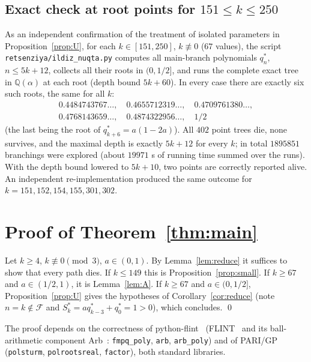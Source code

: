 \documentclass[11pt]{amsart}
\theoremstyle{definition}
\theoremstyle{remark}
\newcommand{\F}{\mathcal{F}}
\begin{document}
\subsection*{Exact check at root points for \texorpdfstring{$151\le k\le 250$}{151 <= k <= 250}}
As an independent confirmation of the treatment of isolated parameters in
Proposition~\ref{prop:U}, for each $k\in[151,250]$, $k\not\equiv 0$ ($67$ values), the
script \texttt{retsenziya/ildiz\_nuqta.py} computes all main-branch polynomials
$q^*_n$, $n\le 5k+12$, collects all their roots in $(0,1/2]$, and runs the complete
exact tree in $\mathbb{Q}(\alpha)$ at each root (depth bound $5k+60$). In every case
there are exactly six such roots, the same for all $k$:
\[
\begin{gathered}
0.4484743767\ldots,\quad 0.4655712319\ldots,\quad 0.4709761380\ldots,\\
0.4768143659\ldots,\quad 0.4874322956\ldots,\quad 1/2
\end{gathered}
\]
(the last being the root of $q^*_{k+6}=a(1-2a)$). All $402$ point trees die, none
survives, and the maximal depth is exactly $5k+12$ for every $k$; in total
$1895851$ branchings were explored (about $19971$ s of running time summed over the
runs). With the depth bound lowered to $5k+10$, two points are correctly reported
alive. An independent re-implementation produced the same outcome for
$k=151,152,154,155,301,302$.

\section{Proof of Theorem~\ref{thm:main}}

Let $k\ge 4$, $k\not\equiv 0\pmod 3$, $a\in(0,1)$. By Lemma~\ref{lem:reduce} it
suffices to show that every path dies. If $k\le 149$ this is
Proposition~\ref{prop:small}. If $k\ge 67$ and $a\in(1/2,1)$, it
is Lemma~\ref{lem:A}. If $k\ge 67$ and $a\in(0,1/2]$, Proposition~\ref{prop:U} gives
the hypotheses of Corollary~\ref{cor:reduce} (note $n=k\notin\F$ and
$S^*_k=aq^*_{k-3}+q^*_0=1>0$), which concludes. \qed

The proof depends on the correctness of python-flint~\cite{pythonflint}
(FLINT~\cite{FLINT} and its ball-arithmetic component Arb~\cite{Arb}:
\texttt{fmpq\_poly}, \texttt{arb}, \texttt{arb\_poly}) and of
PARI/GP~\cite{PARI} (\texttt{polsturm}, \texttt{polrootsreal}, \texttt{factor}),
both standard libraries.

\end{document}

